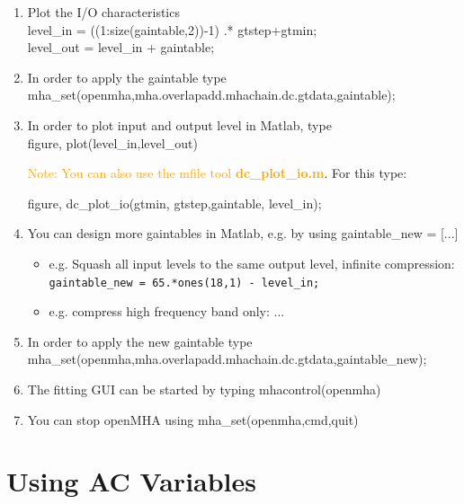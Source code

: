 \documentclass[11pt,a4paper,twoside]{article}
\newcommand{\+}{\discretionary{\mbox{\scriptsize$\hookleftarrow$}}{}{}}
\begin{document}
{{\begin{enumerate}
This would result in an input/output characteristic which is the same for every channel/band.

\item Plot the I/O characteristics \\
{\ttfamily level\_in = ((1:size(gaintable,2))-1) .* gtstep\textquotesingle{}+gtmin\textquotesingle{};}\\
{\ttfamily level\_out = level\_in + gaintable;}

\item In order to apply the gaintable type \\
{\ttfamily mha\_set(openmha,\textquotesingle{}mha.overlapadd.mhachain.dc.gtdata\textquotesingle{},gaintable);}
\item In order to plot input and output level in Matlab, type \\ {\ttfamily figure, plot(level\_in\textquotesingle{},level\_out\textquotesingle{})}

\textcolor{orange}{Note: You can also use the mfile tool \textbf{dc\_plot\_io.m}}. For this type: 

{\ttfamily figure, dc\_plot\_io(gtmin, gtstep,gaintable, level\_in);}


\item You can design more gaintables in Matlab, e.g. by using 
  {\ttfamily gaintable\_new = [...]}
  \begin{itemize}
  \item e.g. Squash all input levels to the same output level, infinite compression:
    \\ \texttt{gaintable\_new = 65.*ones(18,1) - level\_in;}
  \item e.g. compress high frequency band only: ...
  \end{itemize}
\item In order to apply the new gaintable type \\
{\ttfamily mha\_set(openmha,\textquotesingle{}mha.overlapadd.mhachain.dc.gtdata\textquotesingle{},gaintable\_new);}
\item The fitting GUI can be started by typing {\ttfamily mhacontrol(openmha)}
\item You can stop openMHA using {\ttfamily mha\_set(openmha,\textquotesingle{}cmd\textquotesingle{},\textquotesingle{}quit\textquotesingle{})}



\end{enumerate}
\newpage
\section{Using AC Variables}
\label{sec:ac_variables}

}}
\end{document}
